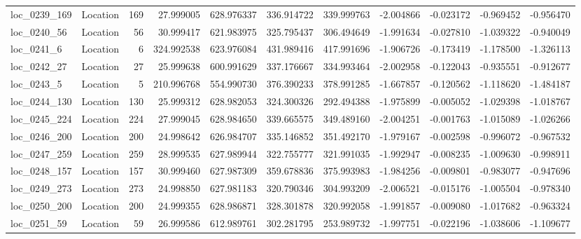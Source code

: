 \begin{tabular}{llrrrrrrrrr}
 loc_0239_169 &        Location &             169 &  27.999005 & 628.976337 &  336.914722 &    339.999763 &  -2.004866 &  -0.023172 &   -0.969452 &     -0.956470 \\
  loc_0240_56 &        Location &              56 &  30.999417 & 621.983975 &  325.795437 &    306.494649 &  -1.991634 &  -0.027810 &   -1.039322 &     -0.940049 \\
   loc_0241_6 &        Location &               6 & 324.992538 & 623.976084 &  431.989416 &    417.991696 &  -1.906726 &  -0.173419 &   -1.178500 &     -1.326113 \\
  loc_0242_27 &        Location &              27 &  25.999638 & 600.991629 &  337.176667 &    334.993464 &  -2.002958 &  -0.122043 &   -0.935551 &     -0.912677 \\
   loc_0243_5 &        Location &               5 & 210.996768 & 554.990730 &  376.390233 &    378.991285 &  -1.667857 &  -0.120562 &   -1.118620 &     -1.484187 \\
 loc_0244_130 &        Location &             130 &  25.999312 & 628.982053 &  324.300326 &    292.494388 &  -1.975899 &  -0.005052 &   -1.029398 &     -1.018767 \\
 loc_0245_224 &        Location &             224 &  27.999045 & 628.984650 &  339.665575 &    349.489160 &  -2.004251 &  -0.001763 &   -1.015089 &     -1.026266 \\
 loc_0246_200 &        Location &             200 &  24.998642 & 626.984707 &  335.146852 &    351.492170 &  -1.979167 &  -0.002598 &   -0.996072 &     -0.967532 \\
 loc_0247_259 &        Location &             259 &  28.999535 & 627.989944 &  322.755777 &    321.991035 &  -1.992947 &  -0.008235 &   -1.009630 &     -0.998911 \\
 loc_0248_157 &        Location &             157 &  30.999460 & 627.987309 &  359.678836 &    375.993983 &  -1.984256 &  -0.009801 &   -0.983077 &     -0.947696 \\
 loc_0249_273 &        Location &             273 &  24.998850 & 627.981183 &  320.790346 &    304.993209 &  -2.006521 &  -0.015176 &   -1.005504 &     -0.978340 \\
 loc_0250_200 &        Location &             200 &  24.999355 & 628.986871 &  328.301878 &    320.992058 &  -1.991857 &  -0.009080 &   -1.017682 &     -0.963324 \\
  loc_0251_59 &        Location &              59 &  26.999586 & 612.989761 &  302.281795 &    253.989732 &  -1.997751 &  -0.022196 &   -1.038606 &     -1.109677 \\

\end{tabular}
